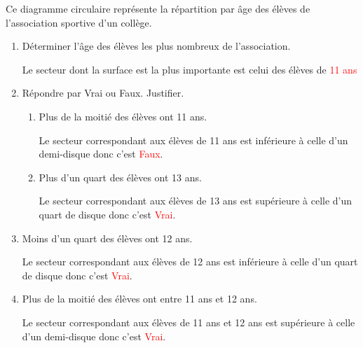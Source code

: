\begin{corrige}
    Ce diagramme circulaire représente la répartition par âge des élèves de l'association sportive d'un collège.

    \begin{enumerate}
        \item Déterminer l'âge des élèves les plus nombreux de l'association.
        
        Le secteur dont la surface est la plus importante est celui des élèves de \textcolor{red}{11 ans}
        \item Répondre par Vrai ou Faux. Justifier.
        
        \begin{enumerate}
            \item Plus de la moitié des élèves ont 11 ans.
            
            Le secteur correspondant aux élèves de 11 ans est inférieure à celle d'un demi-disque donc c'est \textcolor{red}{Faux}.
            \item Plus d'un quart des élèves ont 13 ans.
            
            Le secteur correspondant aux élèves de 13 ans est supérieure à celle d'un quart de disque donc c'est \textcolor{red}{Vrai}.

        \end{enumerate}
    \end{enumerate}
    \Coupe
    \begin{enumerate}        
        \begin{enumerate}
            \setcounter{enumii}{2}
            \item Moins d'un quart des élèves ont 12 ans.
            
            Le secteur correspondant aux élèves de 12 ans est inférieure à celle d'un quart de disque donc c'est \textcolor{red}{Vrai}.
            \item Plus de la moitié des élèves ont entre 11 ans et 12 ans.
            
            Le secteur correspondant aux élèves de 11 ans et 12 ans est supérieure à celle d'un demi-disque donc c'est \textcolor{red}{Vrai}.
        \end{enumerate}
    \end{enumerate}
\end{corrige}

